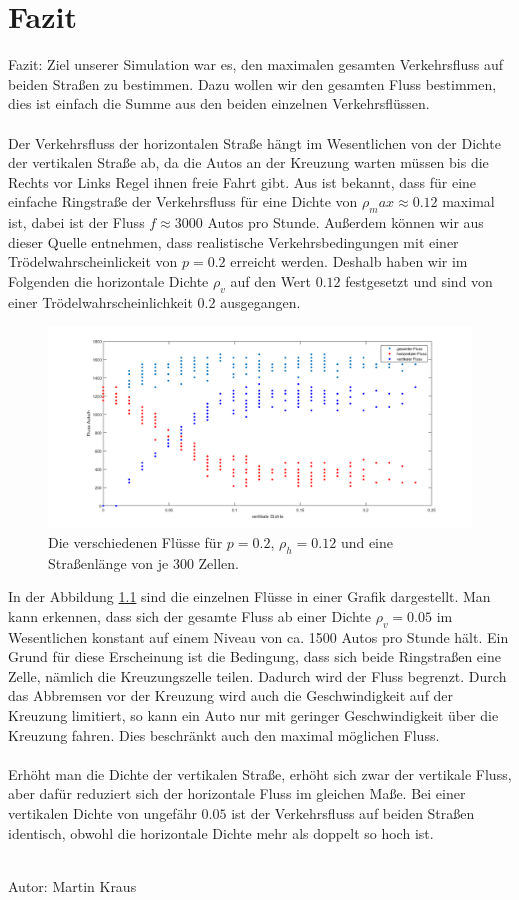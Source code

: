 \chapter{Fazit}\label{chap5}

Fazit: Ziel unserer Simulation war es, den maximalen gesamten Verkehrsfluss auf beiden Straßen zu bestimmen. Dazu wollen wir den gesamten Fluss bestimmen, dies ist einfach die Summe aus den beiden einzelnen Verkehrsflüssen.
\\ \\
Der Verkehrsfluss der horizontalen Straße hängt im Wesentlichen von der Dichte der vertikalen Straße ab, da die Autos an der Kreuzung warten müssen bis die Rechts vor Links Regel ihnen freie Fahrt gibt. Aus \cite{book:bungartz} ist bekannt, dass für eine einfache Ringstraße der Verkehrsfluss für eine Dichte von $\rho_max \approx 0.12$ maximal ist, dabei ist der Fluss $f \approx 3000$ Autos pro Stunde. Außerdem können wir aus dieser Quelle entnehmen, dass realistische Verkehrsbedingungen mit einer Trödelwahrscheinlickeit von $p=0.2$ erreicht werden. Deshalb haben wir im Folgenden die horizontale Dichte $\rho_v$ auf den Wert $0.12$ festgesetzt und sind von einer Trödelwahrscheinlichkeit $0.2$ ausgegangen. 
%
\begin{figure}[H]%
\centering
\includegraphics[width=12cm]{MaxFluss.png}%
\caption[Flussdiagramm]{Die verschiedenen Flüsse für $p=0.2$, $\rho_h=0.12$ und eine Straßenlänge von je 300 Zellen.}%
\label{pic:MaxFluss}%
\end{figure}
\noindent
In der Abbildung \ref{pic:MaxFluss} sind die einzelnen Flüsse in einer Grafik dargestellt. Man kann erkennen, dass sich der gesamte Fluss ab einer Dichte $\rho_v =0.05$ im Wesentlichen konstant auf einem Niveau von ca. 1500 Autos pro Stunde hält. Ein Grund für diese Erscheinung ist die Bedingung, dass sich beide Ringstraßen eine Zelle, nämlich die Kreuzungszelle teilen. Dadurch wird der Fluss begrenzt. Durch das Abbremsen vor der Kreuzung wird auch die Geschwindigkeit auf der Kreuzung limitiert, so kann ein Auto nur mit geringer Geschwindigkeit über die Kreuzung fahren. Dies beschränkt auch den maximal möglichen Fluss. 
\\ \\
Erhöht man die Dichte der vertikalen Straße, erhöht sich zwar der vertikale Fluss, aber dafür reduziert sich der horizontale Fluss im gleichen Maße. Bei einer vertikalen Dichte von ungefähr $0.05$ ist der Verkehrsfluss auf beiden Straßen identisch, obwohl die horizontale Dichte mehr als doppelt so hoch ist. \\ \\

\begin{flushright}
Autor: Martin Kraus
\end{flushright}


